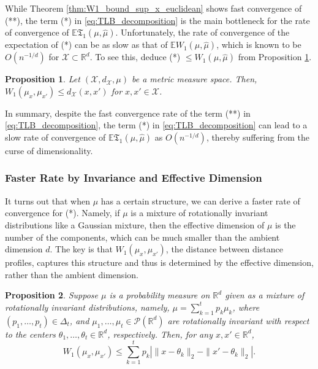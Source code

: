 \documentclass[11pt,letterpaper]{article}
\newtheorem{proposition}{Proposition}
\theoremstyle{definition}
\numberwithin{equation}{section}
\newcommand{\cX}{\mathcal{X}}
\newcommand{\R}{\mathbb{R}}
\newcommand{\E}{\mathbb{E}} %
\begin{document}
While Theorem \ref{thm:W1_bound_sup_x_euclidean} shows fast convergence of (**), the term (*) in \eqref{eq:TLB_decomposition} is the main bottleneck for the rate of convergence of $\E \mathfrak{T}_1(\mu, \hat{\mu})$. Unfortunately, the rate of convergence of the expectation of (*) can be as slow as that of $\E W_1(\mu, \hat{\mu})$, which is known to be $O(n^{-1 / d})$ for $\cX \subset \R^d$. To see this, deduce (*) $\le W_1(\mu, \hat{\mu})$ from Proposition \ref{prop:analytic_properties}.

\begin{proposition}
    \label{prop:analytic_properties}
    Let $(\cX, d_\cX, \mu)$ be a metric measure space. Then, $W_1(\mu_x, \mu_{x'}) \le d_\cX(x, x')$ for $x, x' \in \cX$. 
\end{proposition}

In summary, despite the fast convergence rate of the term (**) in \eqref{eq:TLB_decomposition}, the term (*) in \eqref{eq:TLB_decomposition} can lead to a slow rate of convergence of $\E \mathfrak{T}_1(\mu, \hat{\mu})$ as $O(n^{-1 / d})$, thereby suffering from the curse of dimensionality. 


\subsubsection{Faster Rate by Invariance and Effective Dimension}
It turns out that when $\mu$ has a certain structure, we can derive a faster rate of convergence for (*). Namely, if $\mu$ is a mixture of rotationally invariant distributions like a Gaussian mixture, then the effective dimension of $\mu$ is the number of the components, which can be much smaller than the ambient dimension $d$. The key is that $W_1(\mu_x, \mu_{x'})$, the distance between distance profiles, captures this structure and thus is determined by the effective dimension, rather than the ambient dimension.

\begin{proposition}
    \label{prop:W1_distance_profiles_mixture}
    Suppose $\mu$ is a probability measure on $\R^d$ given as a mixture of rotationally invariant distributions, namely, $\mu = \sum_{k = 1}^{t} p_k \mu_k$, where $(p_1, \ldots, p_t) \in \Delta_t$, and $\mu_1, \ldots, \mu_t \in \mathscr{P}(\R^d)$ are rotationally invariant with respect to the centers $\theta_1, \ldots, \theta_t \in \R^d$, respectively. Then, for any $x, x' \in \R^d$,
    \begin{equation}
        \label{eq:W1_distance_profiles_mixture}
        W_1(\mu_x, \mu_{x'}) \le \sum_{k = 1}^{t} p_k \left|\|x - \theta_k\|_2 - \|x' - \theta_k\|_2\right|.
    \end{equation}
\end{proposition}
\end{document}
